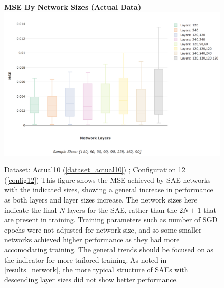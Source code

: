 \documentclass[a4paper,11pt,oneside]{article}
\theoremstyle{plain}
\theoremstyle{definition}
\begin{document}
	\begin{figure}[H]
		\centering 
		\textbf{MSE By Network Sizes (Actual Data)}
		\includegraphics[scale=0.25]{images/results/network/actual_sae_mse_box.png} 
		\caption[MSE By Network Sizes (Actual Data)]{Dataset: Actual10 (\ref{dataset_actual10}) ; Configuration 12 (\ref{config12})
			\newline This figure shows the MSE achieved by SAE networks with the indicated sizes, showing a general increase in performance as both layers and layer sizes increase. The network sizes here indicate the final $N$ layers for the SAE, rather than the $2N + 1$ that are present in training. Training parameters such as number of SGD epochs were not adjusted for network size, and so some smaller networks achieved higher performance as they had more accomodating training. The general trends should be focused on as the indicator for more tailored training. As noted in \ref{results_network}, the more typical structure of SAEs with descending layer sizes did not show better performance.}
		\label{figure-actual_sae_mse_box}
	\end{figure}
	
\end{document}
